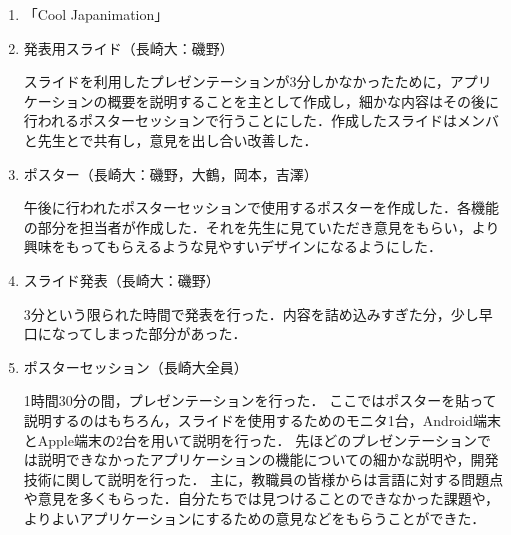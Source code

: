 \begin{enumerate}
\item 「Cool Japanimation」
\par
\item 発表用スライド（長崎大：磯野）
\par
スライドを利用したプレゼンテーションが3分しかなかったために，アプリケーションの概要を説明することを主として作成し，細かな内容はその後に行われるポスターセッションで行うことにした．作成したスライドはメンバと先生とで共有し，意見を出し合い改善した．
\item ポスター（長崎大：磯野，大鶴，岡本，吉澤）
\par
午後に行われたポスターセッションで使用するポスターを作成した．各機能の部分を担当者が作成した．それを先生に見ていただき意見をもらい，より興味をもってもらえるような見やすいデザインになるようにした．
\item スライド発表（長崎大：磯野）
\par
3分という限られた時間で発表を行った．内容を詰め込みすぎた分，少し早口になってしまった部分があった．
\item ポスターセッション（長崎大全員）
\par
1時間30分の間，プレゼンテーションを行った．
ここではポスターを貼って説明するのはもちろん，スライドを使用するためのモニタ1台，Android端末とApple端末の2台を用いて説明を行った．
先ほどのプレゼンテーションでは説明できなかったアプリケーションの機能についての細かな説明や，開発技術に関して説明を行った．
主に，教職員の皆様からは言語に対する問題点や意見を多くもらった．自分たちでは見つけることのできなかった課題や，よりよいアプリケーションにするための意見などをもらうことができた．
\end{enumerate}　
\par
{}
